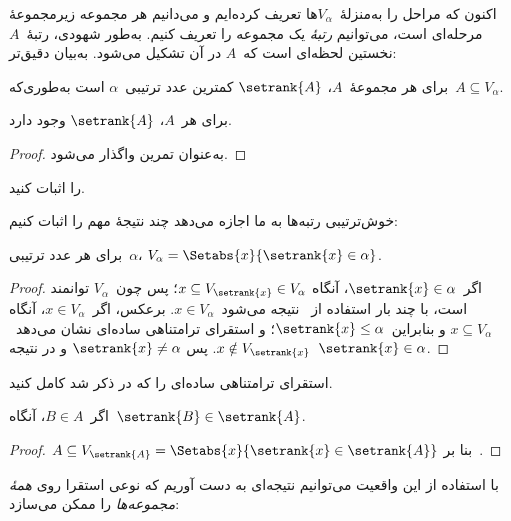 \documentclass[../../../include/open-logic-section]{subfiles}
\begin{document}

اکنون که مراحل را به‌منزلهٔ~$V_\alpha$ها تعریف کرده‌ایم و می‌دانیم هر
مجموعه زیرمجموعهٔ مرحله‌ای است، می‌توانیم \emph{رتبهٔ} یک مجموعه را تعریف
کنیم. به‌طور شهودی، رتبهٔ~$A$ نخستین لحظه‌ای است که~$A$ در آن تشکیل
می‌شود. به‌بیان دقیق‌تر:

\begin{defn}
برای هر مجموعهٔ~$A$، $\setrank{A}$ کمترین عدد ترتیبی~$\alpha$ است
به‌طوری‌که~$A\subseteq V_\alpha$.
\end{defn}
\begin{prop}
	برای هر~$A$، $\setrank{A}$ وجود دارد.
\end{prop}
\begin{proof}
	به‌عنوان تمرین واگذار می‌شود.
\end{proof}
\begin{prob}
	 را اثبات کنید.
\end{prob}
\noindent
خوش‌ترتیبی رتبه‌ها به ما اجازه می‌دهد چند نتیجهٔ مهم را اثبات کنیم:
\begin{prop}
برای هر عدد ترتیبی~$\alpha$،
$V_\alpha=\Setabs{x}{\setrank{x}\in\alpha}$.
\end{prop}

\begin{proof}
اگر~$\setrank{x}\in\alpha$، آنگاه
$x\subseteq V_{\setrank{x}}\in V_\alpha$؛ پس چون~$V_\alpha$ توانمند
است، با چند بار استفاده از~ نتیجه
می‌شود~$x\in V_\alpha$. برعکس، اگر~$x\in V_\alpha$، آنگاه
$x\subseteq V_\alpha$ و بنابراین~$\setrank{x}\leq\alpha$؛ و استقرای
ترامتناهی ساده‌ای نشان می‌دهد~$x\notin V_{\setrank{x}}$. پس
$\setrank{x}\neq\alpha$ و در نتیجه~$\setrank{x}\in\alpha$.
\end{proof}
\begin{prob}
	استقرای ترامتناهی ساده‌ای را که در
	 ذکر شد کامل کنید.
\end{prob}

\begin{prop}
اگر~$B\in A$، آنگاه~$\setrank{B}\in\setrank{A}$.
\end{prop}

\begin{proof}
$A\subseteq V_{\setrank{A}}=
\Setabs{x}{\setrank{x}\in\setrank{A}}$ بنا بر~.
\end{proof}
\noindent
با استفاده از این واقعیت می‌توانیم نتیجه‌ای به دست آوریم که نوعی استقرا
روی \emph{همهٔ مجموعه‌ها} را ممکن می‌سازد:
\end{document}
